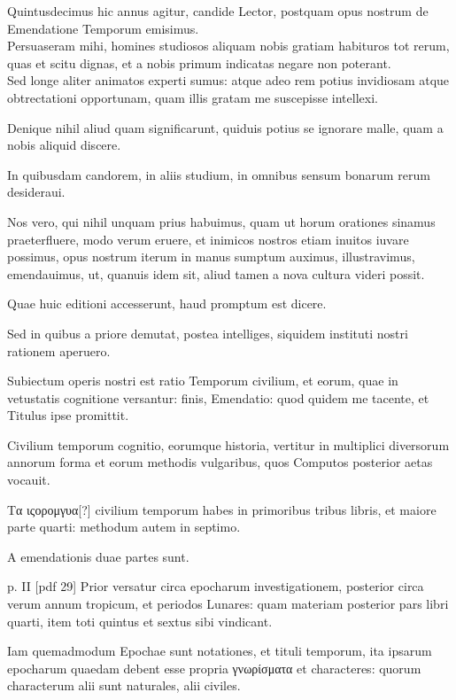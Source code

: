 \setcounter{parcount}{0}
\begin{parnumbers}
Quintusdecimus hic annus agitur, candide
Lector, postquam opus nostrum de
Emendatione Temporum emisimus.
\\ \p
Persuaseram
mihi, homines studiosos aliquam nobis
gratiam habituros tot rerum, quas et scitu
dignas, et a nobis primum indicatas negare
non poterant.
\\ \p
Sed longe aliter animatos experti
sumus: atque adeo rem potius invidiosam
atque obtrectationi opportunam, quam illis gratam me suscepisse
intellexi.

Denique nihil aliud quam significarunt, quiduis potius
se ignorare malle, quam a nobis aliquid discere.

In quibusdam
candorem, in aliis studium, in omnibus sensum bonarum rerum desideraui.

Nos vero, qui nihil unquam prius habuimus, quam ut horum
orationes sinamus praeterfluere, modo verum eruere, et inimicos
nostros etiam inuitos iuvare possimus, opus nostrum iterum in
manus sumptum auximus, illustravimus, emendauimus, ut, quanuis
idem sit, aliud tamen a nova cultura videri possit.

Quae huic editioni
accesserunt, haud promptum est dicere.

Sed in quibus a priore demutat,
postea intelliges, siquidem instituti nostri rationem aperuero.

Subiectum operis nostri est ratio Temporum civilium, et eorum,
quae in vetustatis cognitione versantur: finis, Emendatio: quod quidem
me tacente, et Titulus ipse promittit.

Civilium temporum cognitio,
eorumque historia, vertitur in multiplici diversorum annorum
forma et eorum methodis vulgaribus, quos Computos posterior
aetas vocauit.

\textgreek{Τα ιςορομγυα[?]} civilium temporum habes in primoribus
tribus libris, et maiore parte quarti: methodum autem in septimo.

A emendationis duae partes sunt.

\clearpage
p. II [pdf 29]
Prior versatur circa epocharum
investigationem, posterior circa verum annum tropicum, 
et periodos Lunares: quam materiam posterior pars libri quarti,
item toti quintus et sextus sibi vindicant.

Iam quemadmodum Epochae
sunt notationes, et tituli temporum, ita ipsarum epocharum
quaedam debent esse propria \textgreek{γνωρίσματα} et characteres: quorum
characterum alii sunt naturales, alii civiles. 


\end{parnumbers}
